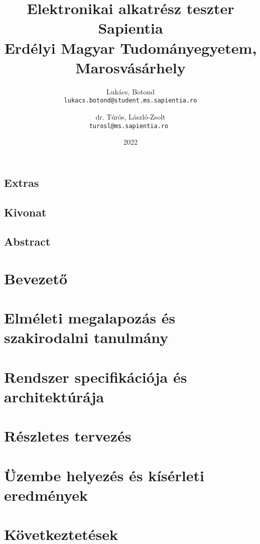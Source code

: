 \documentclass[12pt, twosides]{report}
\title{
	{Elektronikai alkatrész teszter}\\
	{\large Sapientia\\
	Erdélyi Magyar Tudományegyetem, Marosvásárhely}
}
\author{
	Lukács, Botond\\
	\texttt{lukacs.botond@student.ms.sapientia.ro}
	\and
	dr. Túrós, László-Zsolt\\
	\texttt{turosl@ms.sapientia.ro }	
}
\date{2022}
\begin{document}



\section*{Extras}

\pagebreak



\section*{Kivonat}

\pagebreak

\section*{Abstract}

\pagebreak


\tableofcontents

\listoffigures

\chapter{Bevezető}


\chapter{Elméleti megalapozás és szakirodalni tanulmány}


\chapter{Rendszer specifikációja és architektúrája}


\chapter{Részletes tervezés}


\chapter{Üzembe helyezés és kísérleti eredmények}


\chapter{Következtetések}






%

\end{document}
